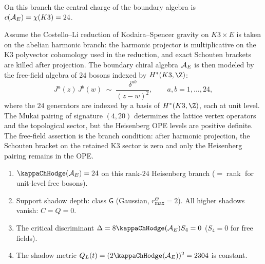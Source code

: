On this branch the central charge of the boundary algebra is
$c(\mathcal{A}_E) = \chi(K3) = 24$.

\begin{proposition}
\label{prop:k3e-boundary-datum}
Assume the Costello--Li reduction of Kodaira--Spencer gravity on
$K3 \times E$ is taken on the abelian harmonic branch: the harmonic
projector is multiplicative on the K3 polyvector cohomology used in the
reduction, and exact Schouten brackets are killed after projection. The
boundary chiral algebra $\mathcal{A}_E$ is then modeled by the free-field
algebra of $24$ bosons indexed by $H^*(K3, \Z)$:
\begin{equation}\label{eq:k3e-boundary-ope}
J^a(z)\, J^b(w) \;\sim\; \frac{\delta^{ab}}{(z-w)^2},
\qquad a, b = 1, \ldots, 24,
\end{equation}
where the $24$ generators are indexed by a basis of $H^*(K3, \Z)$, each
at unit level. The Mukai pairing of signature $(4, 20)$ determines the
lattice vertex operators and the topological sector, but the Heisenberg
OPE levels are positive definite.
The free-field assertion is the branch condition: after harmonic
projection, the Schouten bracket on the retained K3 sector is zero and
only the Heisenberg pairing remains in the OPE.

\begin{enumerate}[label=\textup{(\roman*)}]
\item $\kappaChHodge(\cA_E) = 24$ on this rank-$24$ Heisenberg branch
 \textup{(}$= \operatorname{rank}$ for unit-level free bosons\textup{)}.
\item Support shadow depth: class $\mathsf{G}$ \textup{(}Gaussian,
 \(r^\Theta_{\max} = 2\)\textup{)}. All higher shadows vanish: $C = Q = 0$.
\item The critical discriminant
\(\Delta = 8\kappaChHodge(\cA_E) S_4 = 0\)
 \textup{(}$S_4 = 0$ for free fields\textup{)}.
\item The shadow metric
\(Q_L(t) = (2\kappaChHodge(\cA_E))^2 = 2304\) is constant.
\end{enumerate}
\end{proposition}

